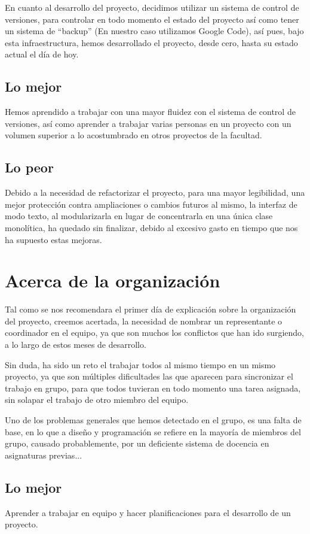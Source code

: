 \documentclass[11 pt]{book}
\begin{document}
		En cuanto al desarrollo del proyecto, decidimos utilizar un sistema de control de versiones, para controlar en todo momento el estado del proyecto así como tener un sistema de “backup” (En nuestro caso utilizamos Google Code), así pues, bajo esta infraestructura, hemos desarrollado el proyecto, desde cero, hasta su estado actual el día de hoy.
		
		\subsection*{Lo mejor}
			Hemos aprendido a trabajar con una mayor fluidez con el sistema de control de versiones, así como aprender a trabajar varias personas en un proyecto con un volumen superior a lo acostumbrado en otros proyectos de la facultad.
		\subsection*{Lo peor}
			Debido a la necesidad de refactorizar el proyecto, para una mayor legibilidad, una mejor protección contra ampliaciones o cambios futuros al mismo, la interfaz de modo texto, al modularizarla en lugar de concentrarla en una única clase monolítica, ha quedado sin finalizar, debido al excesivo gasto en tiempo que nos ha supuesto estas mejoras.
	
	\section*{Acerca de la organización}
		Tal como se nos recomendara el primer día de explicación sobre la organización del proyecto, creemos acertada, la necesidad de nombrar un representante o coordinador en el equipo, ya que son muchos los conflictos que han ido surgiendo, a lo largo de estos meses de desarrollo.

		Sin duda, ha sido un reto el trabajar todos al mismo tiempo en un mismo proyecto, ya que son múltiples dificultades las que aparecen para sincronizar el trabajo en grupo, para que todos tuvieran en todo momento una tarea asignada, sin solapar el trabajo de otro miembro del equipo.

		Uno de los problemas generales que hemos detectado en el grupo, es una falta de base, en lo que a diseño y programación se refiere en la mayoría de miembros del grupo, causado probablemente, por un deficiente sistema de docencia en asignaturas previas...

		\subsection*{Lo mejor}
			Aprender a trabajar en equipo y hacer planificaciones para el desarrollo de un proyecto.
\end{document}
